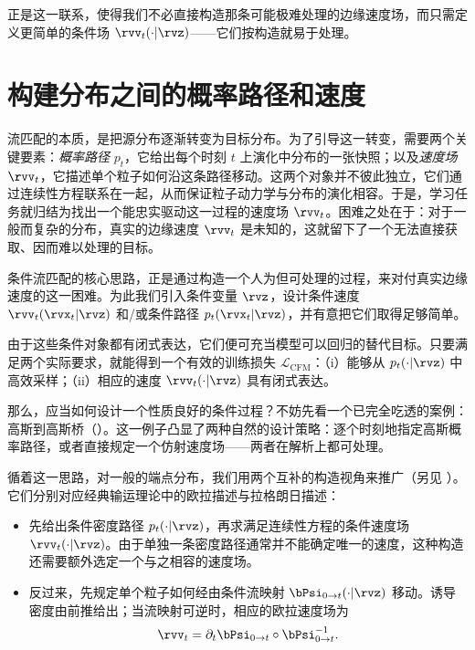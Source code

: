 正是这一联系，使得我们不必直接构造那条可能极难处理的边缘速度场，而只需定义更简单的条件场 $\rvv_t(\cdot| \rvz)$——它们按构造就易于处理。


\section{构建分布之间的概率路径和速度}\label{sec:instance-fm}

流匹配的本质，是把源分布逐渐转变为目标分布。为了引导这一转变，需要两个关键要素：\emph{概率路径} $p_{t}$，它给出每个时刻 $t$ 上演化中分布的一张快照；以及\emph{速度场} $\rvv_{t}$，它描述单个粒子如何沿这条路径移动。这两个对象并不彼此独立，它们通过连续性方程联系在一起，从而保证粒子动力学与分布的演化相容。于是，学习任务就归结为找出一个能忠实驱动这一过程的速度场 $\rvv_t$。困难之处在于：对于一般而复杂的分布，真实的边缘速度 $\rvv_t$ 是未知的，这就留下了一个无法直接获取、因而难以处理的目标。

条件流匹配的核心思路，正是通过构造一个人为但可处理的过程，来对付真实边缘速度的这一困难。为此我们引入条件变量 $\rvz$，设计条件速度 $\rvv_t(\rvx_t|\rvz)$ 和/或条件路径 $p_t(\rvx_t|\rvz)$，并有意把它们取得足够简单。

由于这些条件对象都有闭式表达，它们便可充当模型可以回归的替代目标。只要满足两个实际要求，就能得到一个有效的训练损失 $\mathcal{L}_{\mathrm{CFM}}$：（i）能够从 $p_t(\cdot|\rvz)$ 中高效采样；（ii）相应的速度 $\rvv_t(\cdot|\rvz)$ 具有闭式表达。


那么，应当如何设计一个性质良好的条件过程？不妨先看一个已完全吃透的案例：高斯到高斯桥（）。这一例子凸显了两种自然的设计策略：逐个时刻地指定高斯概率路径，或者直接规定一个仿射速度场——两者在解析上都可处理。


循着这一思路，对一般的端点分布，我们用两个互补的构造视角来推广（另见 ）。它们分别对应经典输运理论中的欧拉描述与拉格朗日描述：

\begin{itemize}
    \item {}
    先给出条件密度路径 $p_t(\cdot|\rvz)$，再求满足连续性方程的条件速度场 $\rvv_t(\cdot|\rvz)$。由于单独一条密度路径通常并不能确定唯一的速度，这种构造还需要额外选定一个与之相容的速度场。

    \item {}
    反过来，先规定单个粒子如何经由条件流映射 $\bPsi_{0\to t}(\cdot|\rvz)$ 移动。诱导密度由前推给出；当流映射可逆时，相应的欧拉速度场为
    \[
    \rvv_t
    =
    \partial_t\bPsi_{0\to t}
    \circ
    \bPsi_{0\to t}^{-1}.
    \]
\end{itemize}

